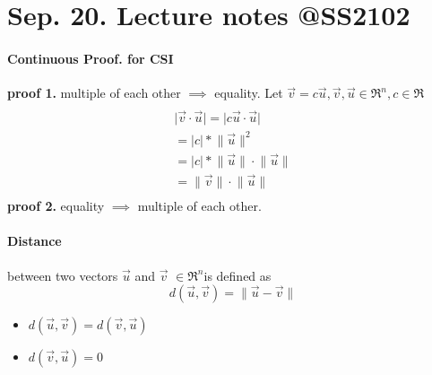 \documentclass{article}
\begin{document}
	\section{Sep. 20. Lecture notes @SS2102}
	\paragraph{Continuous Proof. for CSI}\quad
	\newline \textbf{proof 1.} multiple of each other $\implies$ equality.
	\newline Let $\vec{v} = c \vec{u}, \vec{v},\vec{u} \in \Re^n, c \in \Re$
		\begin{multline}
			\\
			\lvert\vec{v} \cdot \vec{u} \rvert = \lvert c \vec{u} \cdot \vec{u} \rvert \\
			= \lvert c \rvert * \lVert \vec{u} \rVert ^ 2 \\
			= \lvert c \rvert * \lVert \vec{u} \rVert \cdot \lVert \vec{u} \rVert \\
			= \lVert \vec{v} \rVert \cdot \lVert \vec{u} \rVert
			\\
		\end{multline}
	\newline \textbf{proof 2.} equality $\implies$ multiple of each other.
	\paragraph{Distance} between two vectors $\vec{u}$ and $\vec{v}$  $\in \Re^n$is defined as
		\[ d(\vec{u},\vec{v}) = \lVert \vec{u} - \vec{v} \rVert \]
	\begin{itemize}
		\item $d(\vec{u},\vec{v}) = d(\vec{v},\vec{u})$
		\item $d(\vec{v},\vec{u}) = 0$
	\end{itemize}
\end{document}

